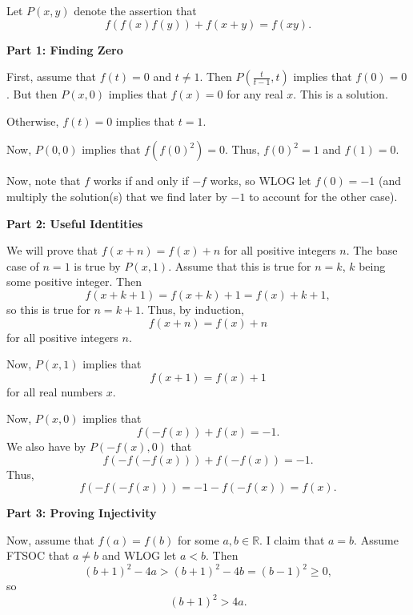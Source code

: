 Let $P\left(x,y\right)$ denote the assertion that \[f\left(f\left(x\right)f\left(y\right)\right)+f\left(x+y\right)=f\left(xy\right).\]

\textbf{Part 1: Finding Zero}

First, assume that $f\left(t\right)=0$ and $t\neq1$. Then $P\left(\frac{t}{t-1},t\right)$ implies that $f\left(0\right)=0$. But then $P\left(x,0\right)$ implies that $f\left(x\right)=0$ for any real $x$. This is a solution.

Otherwise, $f\left(t\right)=0$ implies that $t=1$.

Now, $P\left(0,0\right)$ implies that $f\left(f\left(0\right)^2\right)=0$. Thus, $f\left(0\right)^2=1$ and $f\left(1\right)=0$.

Now, note that $f$ works if and only if $-f$ works, so WLOG let $f\left(0\right)=-1$ (and multiply the solution(s) that we find later by $-1$ to account for the other case).

\textbf{Part 2: Useful Identities}

We will prove that $f\left(x+n\right)=f\left(x\right)+n$ for all positive integers $n$. The base case of $n=1$ is true by $P\left(x,1\right)$. Assume that this is true for $n=k$, $k$ being some positive integer. Then \[f\left(x+k+1\right)=f\left(x+k\right)+1=f\left(x\right)+k+1,\] so this is true for $n=k+1$. Thus, by induction, \[f\left(x+n\right)=f\left(x\right)+n\] for all positive integers $n$.

Now, $P\left(x,1\right)$ implies that \[f\left(x+1\right)=f\left(x\right)+1\] for all real numbers $x$.

Now, $P\left(x,0\right)$ implies that \[f\left(-f\left(x\right)\right)+f\left(x\right)=-1.\] We also have by $P\left(-f\left(x\right),0\right)$ that \[f\left(-f\left(-f\left(x\right)\right)\right)+f\left(-f\left(x\right)\right)=-1.\] Thus, \[f\left(-f\left(-f\left(x\right)\right)\right)=-1-f\left(-f\left(x\right)\right)=f\left(x\right).\]

\textbf{Part 3: Proving Injectivity}

Now, assume that $f\left(a\right)=f\left(b\right)$ for some $a,b\in\mathbb{R}$. I claim that $a=b$. Assume FTSOC that $a\neq b$ and WLOG let $a<b$. Then \[\left(b+1\right)^2-4a>\left(b+1\right)^2-4b=\left(b-1\right)^2\geq0,\] so \[\left(b+1\right)^2>4a.\] 

